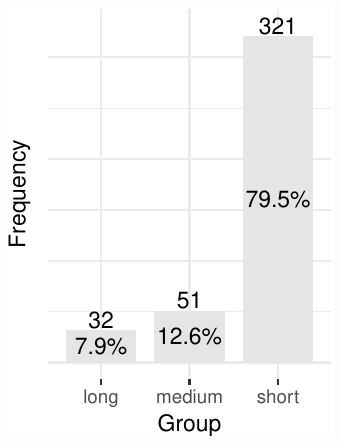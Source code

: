 \begin{figure}[ht]
    \centering
    \begin{subfigure}{0.21\textwidth}
        \centering
        \includegraphics[width=\textwidth]{plots/barplot-timecost.pdf}
        \caption{\label{fig:rq1-barplot}}
    \end{subfigure}%
    ~ 
    \begin{subfigure}{0.25\textwidth}
        \centering

\end{subfigure}
\end{figure}
